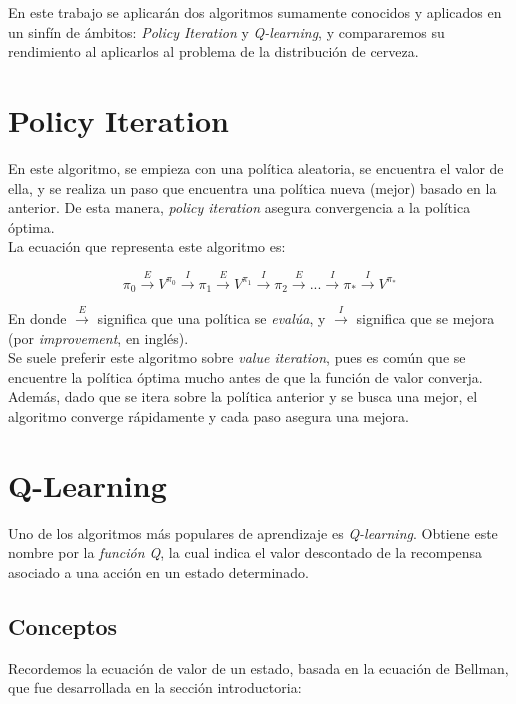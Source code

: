 En este trabajo se aplicar\'an dos algoritmos sumamente conocidos y aplicados en un sinf\'in de \'ambitos: \textit{Policy Iteration} y \textit{Q-learning}, y compararemos su rendimiento al aplicarlos al problema de la distribuci\'on de cerveza.

\section{Policy Iteration}

En este algoritmo, se empieza con una pol\'itica aleatoria, se encuentra el valor de ella, y se realiza un paso que encuentra una pol\'itica nueva (mejor) basado en la anterior. De esta manera, \textit{policy iteration} asegura convergencia a la pol\'itica \'optima. \\

La ecuaci\'on que representa este algoritmo es:

$$
\pi_0 \overset{E}{\rightarrow} V^{\pi_{0}} \overset{I}{\rightarrow}
\pi_1 \overset{E}{\rightarrow} V^{\pi_{1}} \overset{I}{\rightarrow}
\pi_2 \overset{E}{\rightarrow} 
...
\overset{I}{\rightarrow} \pi_{*} \overset{I}{\rightarrow} V^{\pi_{*}}
$$

En donde $\overset{E}{\rightarrow}$ significa que una pol\'itica se \textit{eval\'ua}, y $\overset{I}{\rightarrow}$ significa que se mejora (por \textit{improvement}, en ingl\'es). \\

Se suele preferir este algoritmo sobre \textit{value iteration}, pues es com\'un que se encuentre la pol\'itica \'optima mucho antes de que la funci\'on de valor converja. Adem\'as, dado que se itera sobre la pol\'itica anterior y se busca una mejor, el algoritmo converge r\'apidamente y cada paso asegura una mejora.

\section{Q-Learning}

Uno de los algoritmos m\'as populares de aprendizaje es \textit{Q-learning}. Obtiene este nombre por la \textit{funci\'on Q}, la cual indica el valor descontado de la recompensa asociado a una acci\'on en un estado determinado.

\subsection{Conceptos}

Recordemos la ecuaci\'on de valor de un estado, basada en la ecuaci\'on de Bellman, que fue desarrollada en la secci\'on introductoria:

